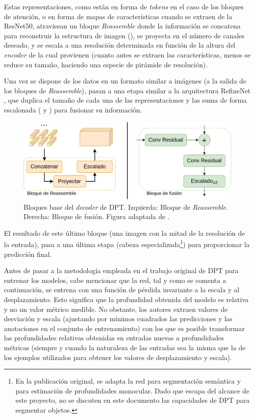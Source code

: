 Estas representaciones, como están en forma de \textit{tokens} en el caso de los bloques de atención, o en forma de mapas de características cuando se extraen de la ResNet50, atraviesan un bloque \textit{Reassemble} donde la información se concatena para reconstruir la estructura de imagen (), se proyecta en el número de canales deseado, y se escala a una resolución determinada en función de la altura del \textit{encoder} de la cual provienen (cuanto antes se extraen las características, menos se reduce su tamaño, haciendo una especie de pirámide de resolución).

Una vez se dispone de los datos en un formato similar a imágenes (a la salida de los bloques de \textit{Reassemble}), pasan a una etapa similar a la arquitectura RefineNet \cite{refinenet}, que duplica el tamaño de cada una de las representaciones y las suma de forma escalonada ( y ) para fusionar su información.

\begin{figure}[H]
\centering
\includegraphics[width=0.7\linewidth]{imagenes/reassemble-fusion.png} 
\captionsetup{width=.7\linewidth}
\caption{Bloques base del \textit{decoder} de DPT. Izquierda: Bloque de \textit{Reassemble}. Derecha: Bloque de fusión. Figura adaptada de \cite{visiontransformersDPT}.}
\label{fig:reassemble-fusion}
\end{figure}

El resultado de este último bloque (una imagen con la mitad de la resolución de la entrada), pasa a una última etapa (cabeza especializada\footnote{En la publicación original, se adapta la red para segmentación semántica y para estimación de profundidades monocular. Dado que escapa del alcance de este proyecto, no se discuten en este documento las capacidades de DPT para segmentar objetos.}) para proporcionar la predicción final.

Antes de pasar a la metodología empleada en el trabajo original de DPT para entrenar los modelos, cabe mencionar que la red, tal y como se comenta a continuación, se entrena con una función de pérdida invariante a la escala y al desplazamiento. Esto significa que la profundidad obtenida del modelo es relativa y no un valor métrico medible. No obstante, los autores extraen valores de desviación y escala (ajustando por mínimos cuadrados las predicciones y las anotaciones en el conjunto de entrenamiento) con los que es posible transformar las profundidades relativas obtenidas en entradas nuevas a profundidades métricas (siempre y cuando la naturaleza de las entradas sea la misma que la de los ejemplos utilizados para obtener los valores de desplazamiento y escala).

